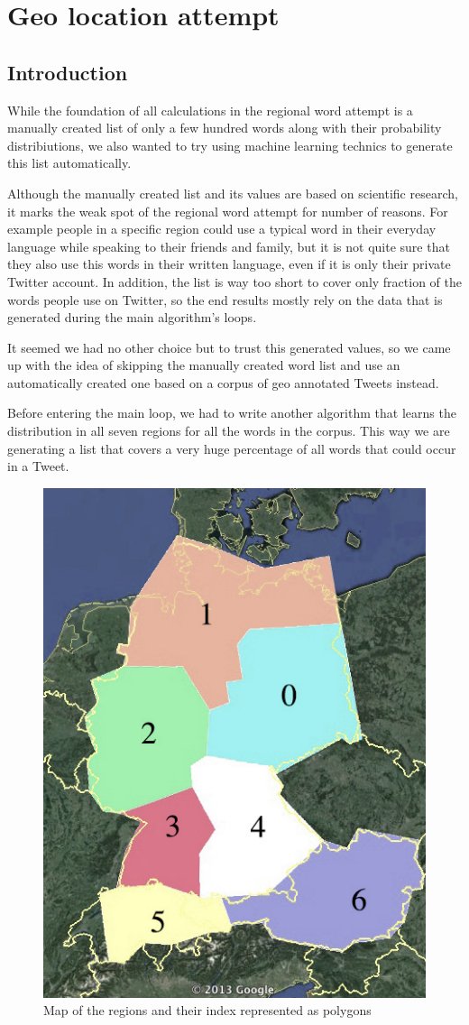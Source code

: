 \documentclass[../Main.tex]{subfiles}
\begin{document}
\section{Geo location attempt}
\subsection{Introduction}
While the foundation of all calculations in the regional word attempt is a manually created list of only a few hundred words along with their probability distribiutions, we also wanted to try using machine learning technics to generate this list automatically.

Although the manually created list and its values are based on scientific research, it marks the weak spot of the regional word attempt for number of reasons. For example people in a specific region could use a typical word in their everyday language while speaking to their friends and family, but it is not quite sure that they also use this words in their written language, even if it is only their private Twitter account. In addition, the list is way too short to cover only fraction of the words people use on Twitter, so the end results mostly rely on the data that is generated during the main algorithm's loops.

It seemed we had no other choice but to trust this generated values, so we came up with the idea of skipping the manually created word list and use an automatically created one based on a corpus of geo annotated Tweets instead.

Before entering the main loop, we had to write another algorithm that learns the distribution in all seven regions for all the words in the corpus. This way we are generating a list that covers a very huge percentage of all words that could occur in a Tweet.

\begin{figure}
  \begin{center}
   \includegraphics[width=0.5\columnwidth]{../img/polygone_satt.jpg}
    \caption{\label{geo_polymap} Map of the regions and their index represented as polygons}
  \end{center}
\end{figure}
\end{document}
